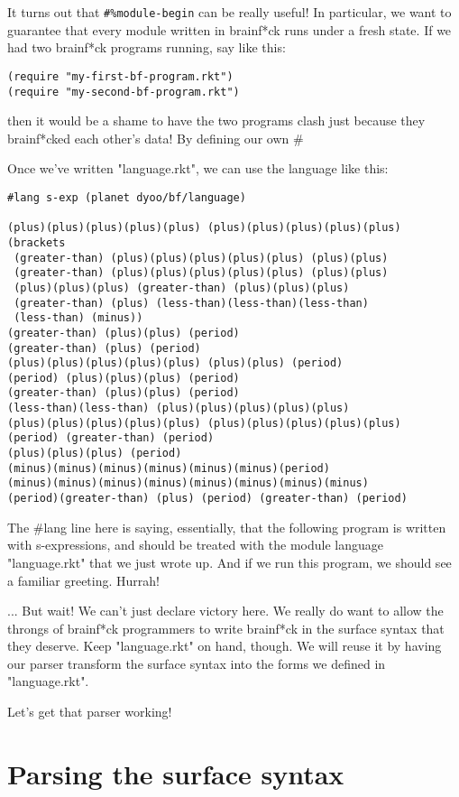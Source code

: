 \documentclass{article}
\begin{document}
It turns out that \verb+#%module-begin+ can be really useful! In particular, we want to guarantee that every module written in brainf*ck runs under a fresh state. If we had two brainf*ck programs running, say like this:
\begin{verbatim}
(require "my-first-bf-program.rkt")
(require "my-second-bf-program.rkt")
\end{verbatim}
then it would be a shame to have the two programs clash just because they brainf*cked each other’s data! By defining our own #%


Once we’ve written "language.rkt", we can use the language like this:
\begin{verbatim}
#lang s-exp (planet dyoo/bf/language)
 
(plus)(plus)(plus)(plus)(plus) (plus)(plus)(plus)(plus)(plus)
(brackets
 (greater-than) (plus)(plus)(plus)(plus)(plus) (plus)(plus)
 (greater-than) (plus)(plus)(plus)(plus)(plus) (plus)(plus)
 (plus)(plus)(plus) (greater-than) (plus)(plus)(plus)
 (greater-than) (plus) (less-than)(less-than)(less-than)
 (less-than) (minus))
(greater-than) (plus)(plus) (period)
(greater-than) (plus) (period)
(plus)(plus)(plus)(plus)(plus) (plus)(plus) (period)
(period) (plus)(plus)(plus) (period)
(greater-than) (plus)(plus) (period)
(less-than)(less-than) (plus)(plus)(plus)(plus)(plus)
(plus)(plus)(plus)(plus)(plus) (plus)(plus)(plus)(plus)(plus)
(period) (greater-than) (period)
(plus)(plus)(plus) (period)
(minus)(minus)(minus)(minus)(minus)(minus)(period)
(minus)(minus)(minus)(minus)(minus)(minus)(minus)(minus)
(period)(greater-than) (plus) (period) (greater-than) (period)
\end{verbatim}
The #lang line here is saying, essentially, that the following program is written with s-expressions, and should be treated with the module language "language.rkt" that we just wrote up. And if we run this program, we should see a familiar greeting. Hurrah!

... But wait! We can’t just declare victory here. We really do want to allow the throngs of brainf*ck programmers to write brainf*ck in the surface syntax that they deserve. Keep "language.rkt" on hand, though. We will reuse it by having our parser transform the surface syntax into the forms we defined in "language.rkt".

Let’s get that parser working!

\section{Parsing the surface syntax}
\end{document}
